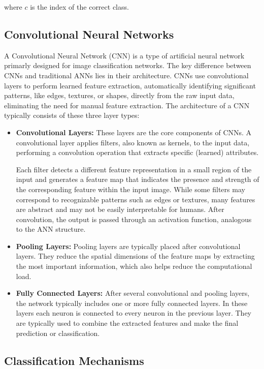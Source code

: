 \documentclass[12pt,fleqn,a4paper]{article}
\begin{document}
where \( c \) is the index of the correct class.

\subsection{Convolutional Neural Networks}
A Convolutional Neural Network (CNN) is a type of artificial neural network primarly designed for image classification networks. The key difference between CNNs and traditional ANNs lies in their architecture. CNNs use convolutional layers to perform learned feature extraction, automatically identifying significant patterns, like edges, textures, or shapes, directly from the raw input data, eliminating the need for manual feature extraction.
The architecture of a CNN typically consists of these three layer types:
\begin{itemize}
\item\textbf{Convolutional Layers:} These layers are the core components of CNNs. A convolutional layer applies filters, also known as kernels, to the input data, performing a convolution operation that extracts specific (learned) attributes. 

Each filter detects a different feature representation in a small region of the input and generates a feature map that indicates the presence and strength of the corresponding feature within the input image. While some filters may correspond to recognizable patterns such as edges or textures, many features are abstract and may not be easily interpretable for humans. After convolution, the output is passed through an activation function, analogous to the ANN structure.
\item\textbf{Pooling Layers:} Pooling layers are typically placed after convolutional layers. They reduce the spatial dimensions of the feature maps by extracting the most important information, which also helps reduce the computational load. 
\item\textbf{Fully Connected Layers:} After several convolutional and pooling layers, the network typically includes one or more fully connected layers. In these layers each neuron is connected to every neuron in the previous layer. They are typically used to combine the extracted features and make the final prediction or classification.
\end{itemize}

\subsection{Classification Mechanisms}
\end{document}
